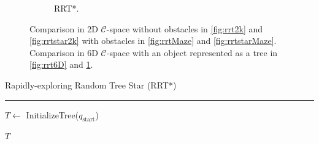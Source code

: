 \documentclass{ctuthesis}
\begin{document}
\begin{figure}[!ht]
\begin{subfigure}[b]{0.45\textwidth}
      \caption{RRT*.}
      \label{fig:rrtstar6D}
  \end{subfigure} 
  \caption{Comparison in 2D $\mathcal{C}$-space without obstacles in \ref{fig:rrt2k} 
  and \ref{fig:rrtstar2k} with obstacles in \ref{fig:rrtMaze} and \ref{fig:rrtstarMaze}.
  Comparison in 6D $\mathcal{C}$-space with an object represented as a tree in \ref{fig:rrt6D} and \ref{fig:rrtstar6D}.}
  \label{fig:RRTvsRRTstar}
\end{figure}
\begin{algorithm}[H]
  \caption{Rapidly-exploring Random Tree Star (RRT*)}
  \label{alg:rrt_star}
  
  \vspace{0.1cm}
  \hrule
  \vspace{0.2cm}
  $T \leftarrow$ InitializeTree($q_{\text{start}}$)\;
  

  \Return $T$\; 
\end{algorithm} 

\clearpage
\end{document}
